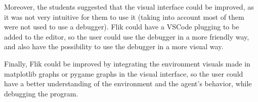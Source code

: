 Moreover, the students suggested that the visual interface could be improved, as it was not very 
intuitive for them to use it (taking into account most of them were not used to use a debugger).
\ac{Flik} could have a VSCode plugging to be added to the editor, so the user could use the debugger 
in a more friendly way, and also have the possibility to use the debugger in a more visual way.

Finally, \ac{Flik} could be improved by integrating the environment visuals made in matplotlib
graphs or pygame graphs in the visual interface, so the user could have a better understanding of 
the environment and the agent's behavior, while debugging the program.

